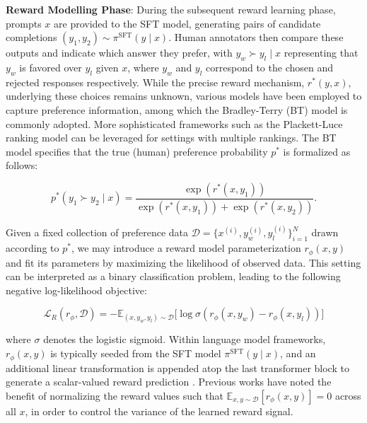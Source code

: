 \textbf{Reward Modelling Phase}: During the subsequent reward learning phase, prompts $x$ are provided to the SFT model, generating pairs of candidate completions $(y_1, y_2)\sim \pi^\text{SFT}(y \mid x)$. Human annotators then compare these outputs and indicate which answer they prefer, with $y_w\succ y_l \mid x$ representing that $y_w$ is favored over $y_l$ given $x$, where $y_w$ and $y_l$ correspond to the chosen and rejected responses respectively. While the precise reward mechanism, $r^*(y, x)$, underlying these choices remains unknown, various models have been employed to capture preference information, among which the Bradley-Terry (BT) model \cite{bradley1952rankanalysis} is commonly adopted. More sophisticated frameworks such as the Plackett-Luce ranking model \citep{plackett1975analysis, luce2012individual} can be leveraged for settings with multiple rankings. The BT model specifies that the true (human) preference probability $p^*$ is formalized as follows:

\begin{equation}\label{eq:bradley-terry}
    p^*(y_1\succ y_2 \mid x)=\frac{\exp\left(r^*(x, y_1)\right)}{\exp\left(r^*(x, y_1)\right) + \exp\left(r^*(x, y_2)\right)}.
\end{equation}

Given a fixed collection of preference data $\mathcal{D}=\bigl\{x^{(i)}, y_w^{(i)}, y_l^{(i)}\bigr\}_{i=1}^N$ drawn according to $p^*$, we may introduce a reward model parameterization $r_{\phi}(x, y)$ and fit its parameters by maximizing the likelihood of observed data. This setting can be interpreted as a binary classification problem, leading to the following negative log-likelihood objective:

\begin{equation}\label{eq:reward_model}
    \mathcal{L}_R(r_{\phi}, \mathcal{D}) = -\mathbb{E}_{(x, y_w, y_l)\sim \mathcal{D}}\bigl[\log \sigma(r_{\phi}(x, y_w)- r_{\phi}(x, y_l))\bigr]
\end{equation}

where $\sigma$ denotes the logistic sigmoid. Within language model frameworks, $r_{\phi}(x, y)$ is typically seeded from the SFT model $\pi^\text{SFT}(y \mid x)$, and an additional linear transformation is appended atop the last transformer block to generate a scalar-valued reward prediction \cite{ziegler2020finetuning}. Previous works have noted the benefit of normalizing the reward values such that $\mathbb{E}_{x,y\sim \mathcal{D}}\left[r_\phi(x, y)\right] = 0$ across all $x$, in order to control the variance of the learned reward signal.

